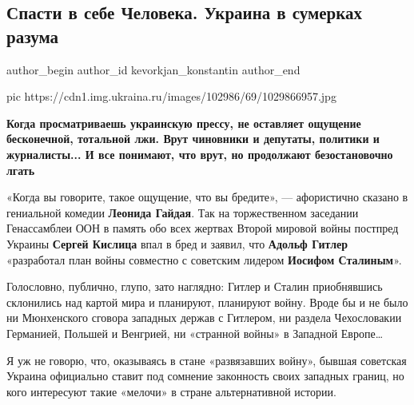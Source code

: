  
 
 
 
 
 
\subsection{Спасти в себе Человека. Украина в сумерках разума}
\label{sec:05_12_2020.news.ru.ukraina_ru.kevorkjan_konstantin.1.spasti_v_sebe_cheloveka}
\ifcmt
	author_begin
   author_id kevorkjan_konstantin
	author_end
\fi

\ifcmt
pic https://cdn1.img.ukraina.ru/images/102986/69/1029866957.jpg
\fi

\begin{leftbar}
				{\bfseries\large\color{orange}
Когда просматриваешь украинскую прессу, не оставляет ощущение бесконечной,
тотальной лжи. Врут чиновники и депутаты, политики и журналисты... И все
понимают, что врут, но продолжают безостановочно лгать
				}
\end{leftbar}

«Когда вы говорите, такое ощущение, что вы бредите», — афористично сказано в
гениальной комедии \textbf{Леонида Гайдая}. Так на торжественном заседании Генассамблеи
ООН в память обо всех жертвах Второй мировой войны постпред Украины 
\textbf{Сергей Кислица} впал в бред и заявил, что \textbf{Адольф Гитлер} «разработал план войны
совместно с советским лидером \textbf{Иосифом Сталиным}».

Голословно, публично, глупо, зато наглядно: Гитлер и Сталин приобнявшись
склонились над картой мира и планируют, планируют войну. Вроде бы и не было ни
Мюнхенского сговора западных держав с Гитлером, ни раздела Чехословакии
Германией, Польшей и Венгрией, ни «странной войны» в Западной Европе…

Я уж не говорю, что, оказываясь в стане «развязавших войну», бывшая советская
Украина официально ставит под сомнение законность своих западных границ, но
кого интересуют такие «мелочи» в стране альтернативной истории.

